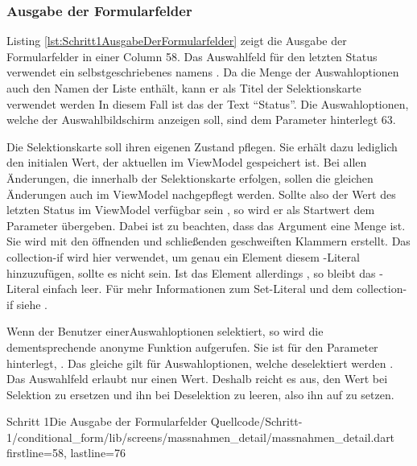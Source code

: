 \ifincludeall \clearpage \fi

\subsubsection{Ausgabe der Formularfelder}

Listing \ref{lst:Schritt1AusgabeDerFormularfelder} zeigt die Ausgabe der Formularfelder in einer Column 58.
Das Auswahlfeld für den letzten Status verwendet ein selbstgeschriebenes  namens  .
Da die Menge der Auswahloptionen auch den Namen der Liste enthält, kann er als Titel der Selektionskarte verwendet werden  In diesem Fall ist das der Text \enquote{Status}.
Die Auswahloptionen, welche  der Auswahlbildschirm anzeigen soll, sind dem Parameter  hinterlegt 63.

Die Selektionskarte soll ihren eigenen Zustand pflegen.
Sie erhält dazu lediglich den initialen Wert, der aktuellen im ViewModel gespeichert ist.
Bei allen Änderungen, die innerhalb der Selektionskarte erfolgen, sollen die gleichen Änderungen auch im ViewModel nachgepflegt werden.
Sollte also der Wert des letzten Status im ViewModel verfügbar sein , so wird er als Startwert dem Parameter   übergeben.
Dabei ist zu beachten, dass das Argument eine Menge ist.
Sie wird mit den  öffnenden und schließenden geschweiften Klammern erstellt.
Das collection-if wird hier verwendet, um genau ein Element diesem -Literal hinzuzufügen, sollte es nicht  sein.
Ist das Element allerdings , so bleibt das -Literal einfach leer.
Für mehr Informationen zum Set-Literal und dem collection-if siehe .


Wenn der Benutzer einerAuswahloptionen selektiert, so  wird die dementsprechende anonyme Funktion aufgerufen.
Sie ist für den Parameter  hinterlegt, .
Das gleiche gilt für Auswahloptionen, welche deselektiert werden .
Das Auswahlfeld erlaubt nur einen Wert.
Deshalb reicht es aus, den Wert bei Selektion zu ersetzen und ihn bei Deselektion zu leeren, also ihn auf  zu setzen.


\begin{alexlisting}{Schritt 1}{Die Ausgabe der Formularfelder}
  {Quellcode/Schritt-1/conditional_form/lib/screens/massnahmen_detail/massnahmen_detail.dart}
  {firstline=58, lastline=76}
  \label{lst:Schritt1AusgabeDerFormularfelder}
\end{alexlisting}


